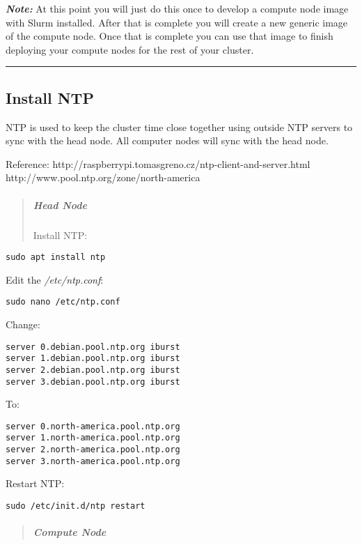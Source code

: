 \documentclass[]{article}
\let\oldsubparagraph\subparagraph
\renewcommand{\subparagraph}[1]{\oldsubparagraph{#1}\mbox{}}
\begin{document}
\emph{\textbf{Note:}} At this point you will just do this once to
develop a compute node image with Slurm installed. After that is
complete you will create a new generic image of the compute node. Once
that is complete you can use that image to finish deploying your compute
nodes for the rest of your cluster.

\begin{center}\rule{0.5\linewidth}{\linethickness}\end{center}

\subsection{Install NTP}\label{install-ntp}

NTP is used to keep the cluster time close together using outside NTP
servers to sync with the head node. All computer nodes will sync with
the head node.

Reference: http://raspberrypi.tomasgreno.cz/ntp-client-and-server.html
http://www.pool.ntp.org/zone/north-america

\begin{quote}
\mbox{}%
\subparagraph{Head Node}\label{head-node-1}

Install NTP:
\end{quote}

\texttt{sudo\ apt\ install\ ntp}

Edit the \emph{/etc/ntp.conf}:

\texttt{sudo\ nano\ /etc/ntp.conf}

Change:

\begin{verbatim}
server 0.debian.pool.ntp.org iburst
server 1.debian.pool.ntp.org iburst
server 2.debian.pool.ntp.org iburst
server 3.debian.pool.ntp.org iburst
\end{verbatim}

To:

\begin{verbatim}
server 0.north-america.pool.ntp.org
server 1.north-america.pool.ntp.org
server 2.north-america.pool.ntp.org
server 3.north-america.pool.ntp.org
\end{verbatim}

Restart NTP:

\texttt{sudo\ /etc/init.d/ntp\ restart}

\begin{quote}
\mbox{}%
\subparagraph{Compute Node}\label{compute-node}
\end{quote}
\end{document}
